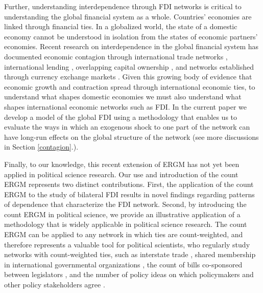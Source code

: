 \documentclass[reqno,onecolumn,letterpaper,12pt]{article}
\begin{document}
Further, understanding interdependence through FDI networks is critical to understanding the global financial system as a whole. Countries' economies are linked through financial ties. In a globalized world, the state of a domestic economy cannot be understood in isolation from the states of economic partners' economies.  Recent research on interdependence in the global financial system has documented economic contagion through international trade networks \citep{kali2010financial,schiavo2010international},  international lending \citep{gai2010contagion,leitner2005financial,lagunoff2001model,zakaria2017evidence}, overlapping capital ownership \citep{chuluun2017global}, and networks established through currency exchange markets \citep{brida2009symbolic,matesanz2014network}. Given this growing body of evidence that economic growth and contraction spread through international economic ties, to understand what shapes domestic economies we must also understand what shapes international economic networks such as FDI. In the current paper we develop a model of the global FDI using a methodology that enables us to evaluate the ways in which an exogenous shock to one part of the network can have long-run effects on the global structure of the network (see more discussions in Section \ref{contagion}.).




Finally, %
to our knowledge, this recent extension of ERGM has not yet been applied in political science research. Our use and introduction of the count ERGM represents two distinct contributions. First, the application of the count ERGM to the study of bilateral FDI results in novel findings regarding patterns of dependence that characterize the FDI network. Second, by introducing the count ERGM in political science, we provide an illustrative application of a methodology that is widely applicable in political science research. The count ERGM can be applied to any network in which ties are count-weighted, and therefore represents a valuable tool for political scientists, who regularly study networks with count-weighted ties, such as interstate trade \citep{ward2007persistent}, shared membership in international governmental organizations \citep{boehmke2016addressing}, the count of bills co-sponsored between legislators \citep{kirkland2013hypothesis}, and the number of policy ideas on which policymakers and other policy stakeholders agree \citep{leifeld2013reconceptualizing}.
\end{document}
